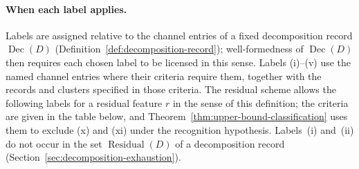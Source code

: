 \documentclass[11pt]{article}
\theoremstyle{definition}
\newcommand{\Dec}[1]{\ensuremath{\operatorname{Dec}\!\left(#1\right)}}
\newcommand{\Residual}[1]{\ensuremath{\operatorname{Residual}\!\left(#1\right)}}
\begin{document}
\paragraph{When each label applies.} Labels are assigned relative to the
channel entries of a fixed decomposition record \(\Dec{D}\)
(Definition~\ref{def:decomposition-record}); well-formedness of \(\Dec{D}\)
then requires each chosen label to be licensed in this sense. Labels (i)--(v) use
the named channel entries where their criteria require them, together with the
records and clusters specified in those criteria. The residual scheme allows the
following labels for a residual feature \(r\) in the sense of this
definition; the criteria are given in the table below, and
Theorem~\ref{thm:upper-bound-classification} uses them to exclude (x) and
(xi) under the recognition hypothesis. Labels~(i) and~(ii) do not occur in the
set \(\Residual{D}\) of a decomposition record
(Section~\ref{sec:decomposition-exhaustion}).
\begingroup\small
\end{document}
